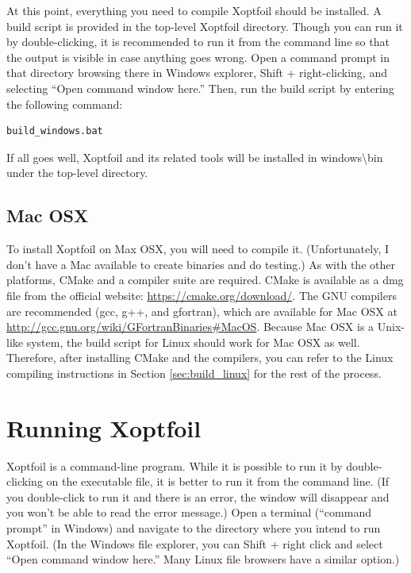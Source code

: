 \documentclass[11pt]{article}
\begin{document}
At this point, everything you need to compile Xoptfoil should be installed. A build script
is provided in the top-level Xoptfoil directory. Though you can run it by double-clicking,
it is recommended to run it from the command line so that the output is visible in case
anything goes wrong. Open a command prompt in that directory browsing there in Windows
explorer, Shift + right-clicking, and selecting ``Open command window here.''
Then, run the build script by entering the following command:

\begin{verbatim}
build_windows.bat
\end{verbatim}

If all goes well, Xoptfoil and its related tools will be installed in
windows{\textbackslash}bin under
the top-level directory.

\subsection{Mac OSX}

To install Xoptfoil on Max OSX, you will need to compile it. (Unfortunately, I don't have a
Mac available to create binaries and do testing.) As with the other platforms, CMake and
a compiler suite are required. CMake is available as a dmg file from the official website:
\url{https://cmake.org/download/}. The GNU compilers are recommended (gcc, g++, and
gfortran), which are available for Mac OSX at
\url{http://gcc.gnu.org/wiki/GFortranBinaries#MacOS}. Because Mac OSX is a Unix-like
system, the build script for Linux should work for Mac OSX as well. Therefore, after
installing CMake and the compilers, you can refer to the Linux compiling instructions in
Section \ref{sec:build_linux} for the rest of the process.

\section{Running Xoptfoil}\label{sec:running}

Xoptfoil is a command-line program. While it is possible to run it by double-clicking on
the executable file, it is better to run it from the command line. (If you double-click to
run it and there is an error, the window will disappear and you won't be able to read the
error message.) Open a terminal
(``command prompt'' in Windows) and navigate to the directory where you intend to run
Xoptfoil. (In the Windows file explorer, you can Shift + right click and select ``Open
command window here.'' Many Linux file browsers have a similar option.)
\end{document}
